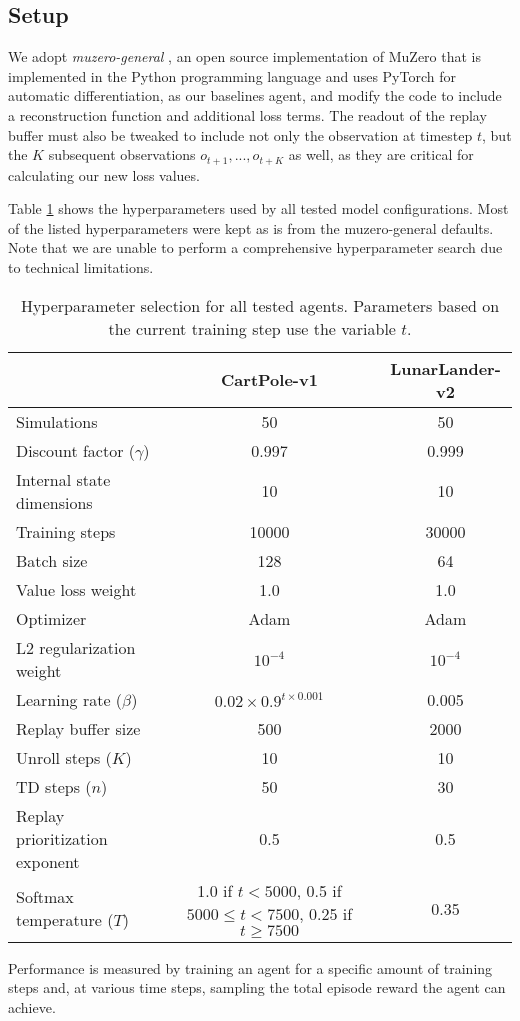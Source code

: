 \subsection{Setup}
We adopt \textit{muzero-general} \cite{muzero-general}, an open source implementation of MuZero that is implemented in the Python programming language and uses PyTorch for automatic differentiation, as our baselines agent, and modify the code to include a reconstruction function and additional loss terms. The readout of the replay buffer must also be tweaked to include not only the observation at timestep $t$, but the $K$ subsequent observations $o_{t+1}, ..., o_{t+K}$ as well, as they are critical for calculating our new loss values.

Table \ref{tab:hyperparameters} shows the hyperparameters used by all tested model configurations. Most of the listed hyperparameters were kept as is from the muzero-general defaults. Note that we are unable to perform a comprehensive hyperparameter search due to technical limitations.
\begin{table}[ht]
    \centering
    \begin{tabular}{|l||c|c|}
        \hline
        & CartPole-v1 & LunarLander-v2 \\
        \hline\hline
        Simulations & 50 & 50 \\
        \hline
        Discount factor ($\gamma$) & 0.997 & 0.999 \\
        \hline
        Internal state dimensions & 10 & 10 \\
        \hline
        Training steps & 10000 & 30000 \\
        \hline
        Batch size & 128 & 64 \\
        \hline
        Value loss weight & 1.0 & 1.0 \\
        \hline
        Optimizer & Adam & Adam \\
        \hline
        L2 regularization weight & $10^{-4}$ & $10^{-4}$ \\
        \hline
        Learning rate ($\beta$) & $0.02 \times 0.9^{t \times 0.001}$ & 0.005 \\
        \hline
        Replay buffer size & 500 & 2000 \\
        \hline
        Unroll steps ($K$) & 10 & 10 \\
        \hline
        TD steps ($n$) & 50 & 30 \\
        \hline
        Replay prioritization exponent & 0.5 & 0.5 \\
        \hline
        Softmax temperature ($T$) & \makecell{
            1.0 if $t<5000$, \\ 0.5 if $5000 \leq t < 7500$, \\ 0.25 if $t \geq 7500$
        } & 0.35 \\
        \hline
    \end{tabular}
    \caption{Hyperparameter selection for all tested agents. Parameters based on the current training step use the variable $t$.}
    \label{tab:hyperparameters}
\end{table}

 Performance is measured by training an agent for a specific amount of training steps and, at various time steps, sampling the total episode reward the agent can achieve.
